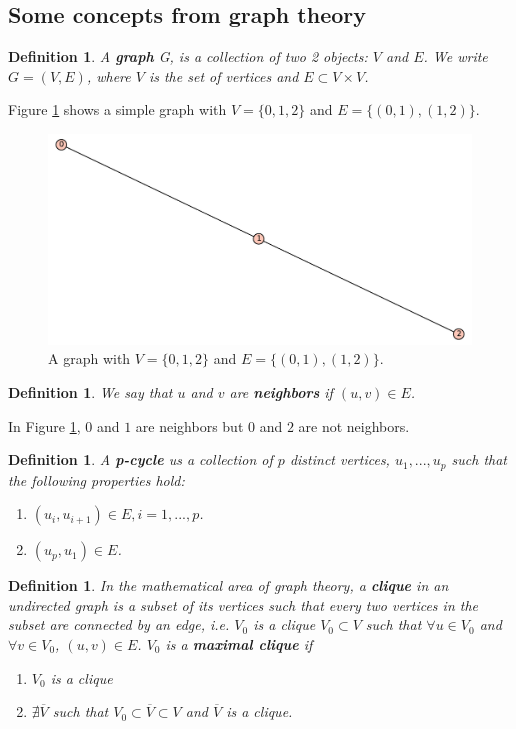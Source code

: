 \documentclass[12pt, leqno]{article}
\newtheorem{defn}[thm]{Definition}
\begin{document}
\subsection{Some concepts from graph theory}
\begin{defn}
A \textbf{graph} G, is a collection of two 2 objects:
$V$ and $E$. We write $G = (V,E)$, where $V$ is the set of vertices
and $E \subset V \times V$. 
\end{defn}
Figure \ref{graph} shows a simple graph
with $V = \{0,1,2\}$ and $E = \{(0,1),(1,2)\}$.
\begin{figure}
\begin{center}
  \includegraphics[scale = 0.4]{h00.pdf}
\end{center}
\caption{A graph with $V = \{0,1,2\}$ and $E = \{(0,1),(1,2)\}$.}
\label{graph}
\end{figure}
\begin{defn}We say that $u$ and $v$ are \textbf{neighbors} if
$(u,v) \in E$. 
\end{defn}
In Figure \ref{graph}, $0$ and $1$ are neighbors but
$0$ and $2$ are not neighbors. 
\begin{defn}
A \textbf{p-cycle} us a collection of $p$ distinct
vertices, $u_1,...,u_p$ such that the following properties hold:
\begin{enumerate} 
\item $(u_i,u_{i+1}) \in E, i = 1, ... , p$.
\item $(u_p,u_{1}) \in E$.
\end{enumerate} 
\end{defn}
\begin{defn} In the mathematical area of graph theory, a
\textbf{clique} in an undirected graph is a subset of its vertices such that
every two vertices in the subset are connected by an edge, i.e. $V_0$
is a clique $V_0 \subset V$ such that $\forall u \in V_0$ and $\forall
v \in V_0$, $(u,v) \in E$. $V_0$ is a \textbf{maximal clique} if 
\begin{enumerate}
\item $V_0$ is a clique
\item $\nexists \overline{V}$ such that $V_0 \subset \overline{V}
  \subset V$ and $\overline{V}$ is a clique.
\end{enumerate}
\end{defn}
\end{document}
